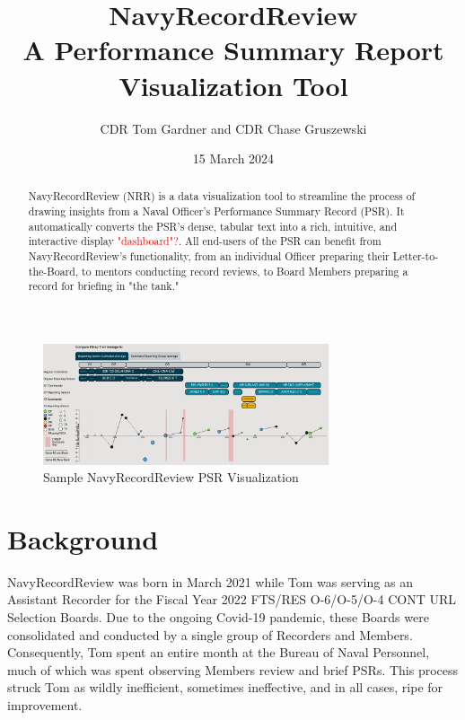 \documentclass[UTF8]{article}
\begin{document}
\title{
  NavyRecordReview \\
  \large A Performance Summary Report Visualization Tool
}

\author{CDR Tom Gardner and CDR Chase Gruszewski}
\date{15 March 2024}
\maketitle


\begin{abstract}
NavyRecordReview (NRR) is a data visualization tool to streamline the process of
drawing insights from a Naval Officer's Performance Summary Record (PSR). It 
automatically converts the PSR's dense, tabular text into a rich, intuitive, 
and interactive display \textcolor{red}{"dashboard"?}. All end-users of the PSR
can benefit from NavyRecordReview's functionality, from an individual Officer 
preparing their Letter-to-the-Board, to mentors conducting record reviews, to
Board Members preparing a record for briefing in "the tank." 
\end{abstract}



\begin{figure}[h!]
 \centering
 \includegraphics[width=0.75\textwidth]{nrr_dashboard.png}
 \caption{Sample NavyRecordReview PSR Visualization}
\end{figure}


\section{Background}
NavyRecordReview was born in March 2021 while Tom was serving as an Assistant
Recorder for the Fiscal Year 2022 FTS/RES O-6/O-5/O-4 CONT URL Selection Boards.
Due to the ongoing Covid-19 pandemic, these Boards were consolidated and
conducted by a single group of Recorders and Members. Consequently, Tom spent an
entire month at the Bureau of Naval Personnel, much of which was spent
observing Members review and brief PSRs. This process struck Tom as wildly
inefficient, sometimes ineffective, and in all cases, ripe for improvement.\\
\end{document}

